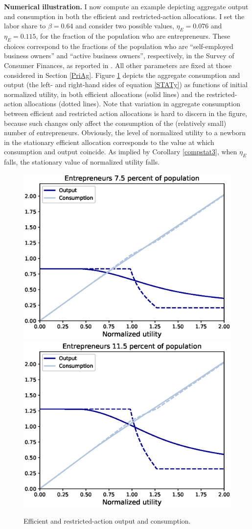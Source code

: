 \documentclass[11pt]{article}
\theoremstyle{plain}
\newcommand{\betaval}{0.64}
\begin{document}
\textbf{Numerical illustration.} I now compute an example depicting aggregate output and consumption in both the efficient and restricted-action allocations. I set the labor share to $\beta = \betaval$ and consider two possible values, $\eta_E = 0.076$ and $\eta_E = 0.115$, for the fraction of the population who are entrepreneurs. These choices correspond to the fractions of the population who are ``self-employed business owners'' and ``active business owners'', respectively, in the Survey of Consumer Finances, as reported in \cite{cagetti_entrepreneurship_2006}. All other parameters are fixed at those considered in Section \ref{PriAg}. Figure \ref{fig:RC} depicts the aggregate consumption and output (the left- and right-hand sides of equation \eqref{STATy}) as functions of initial normalized utility, in both efficient allocations (solid lines) and the restricted-action allocations (dotted lines). Note that variation in aggregate consumption between efficient and restricted action allocations is hard to discern in the figure, because such changes only affect the consumption of the (relatively small) number of entrepreneurs. Obviously, the level of normalized utility to a newborn in the stationary efficient allocation corresponds to the value at which consumption and output coincide.  As implied by Corollary \ref{compstat3}, when $\eta_E$ falls, the stationary value of normalized utility falls. 

\begin{figure}[H]
\centering
\includegraphics[width=0.49\linewidth]{RC_75.0}
\includegraphics[width=0.49\linewidth]{RC_115.0}
\caption{Efficient and restricted-action output and consumption.}\label{fig:RC}
\end{figure}
\end{document}
